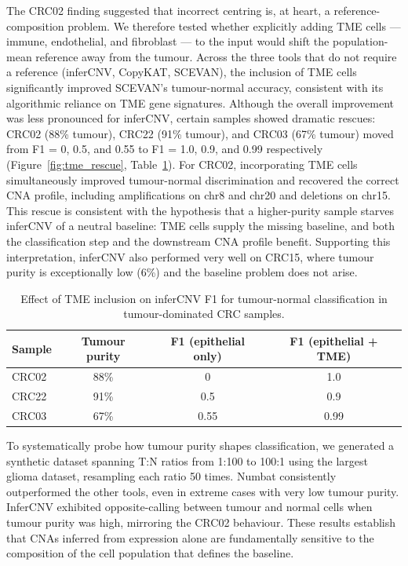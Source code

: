 \documentclass[11pt]{article}
\begin{document}
The CRC02 finding suggested that incorrect centring is, at heart, a
reference-composition problem. We therefore tested whether explicitly adding
TME cells --- immune, endothelial, and fibroblast --- to the input would
shift the population-mean reference away from the tumour. Across the three
tools that do not require a reference (inferCNV, CopyKAT, SCEVAN), the
inclusion of TME cells significantly improved SCEVAN's tumour-normal
accuracy, consistent with its algorithmic reliance on TME gene signatures.
Although the overall improvement was less pronounced for inferCNV, certain
samples showed dramatic rescues: CRC02 (88\% tumour), CRC22 (91\% tumour),
and CRC03 (67\% tumour) moved from F1 = 0, 0.5, and 0.55 to F1 = 1.0, 0.9,
and 0.99 respectively (Figure~\ref{fig:tme_rescue}, Table~\ref{tab:tme}).
For CRC02, incorporating TME cells simultaneously improved tumour-normal
discrimination and recovered the correct CNA profile, including
amplifications on chr8 and chr20 and deletions on chr15. This rescue is
consistent with the hypothesis that a higher-purity sample starves inferCNV
of a neutral baseline: TME cells supply the missing baseline, and both the
classification step and the downstream CNA profile benefit. Supporting this
interpretation, inferCNV also performed very well on CRC15, where tumour
purity is exceptionally low (6\%) and the baseline problem does not arise.

\begin{table}[htbp]
\centering
\caption{Effect of TME inclusion on inferCNV F1 for tumour-normal
classification in tumour-dominated CRC samples.}
\label{tab:tme}
\small
\begin{tabular}{lccc}
\toprule
Sample & Tumour purity & F1 (epithelial only) & F1 (epithelial + TME) \\
\midrule
CRC02 & 88\% & 0    & 1.0  \\
CRC22 & 91\% & 0.5  & 0.9  \\
CRC03 & 67\% & 0.55 & 0.99 \\
\bottomrule
\end{tabular}
\end{table}

To systematically probe how tumour purity shapes classification, we
generated a synthetic dataset spanning T:N ratios from 1:100 to 100:1 using
the largest glioma dataset, resampling each ratio 50 times. Numbat
consistently outperformed the other tools, even in extreme cases with very
low tumour purity. InferCNV exhibited opposite-calling between tumour and
normal cells when tumour purity was high, mirroring the CRC02 behaviour.
These results establish that CNAs inferred from expression alone are
fundamentally sensitive to the composition of the cell population that
defines the baseline.
\end{document}
